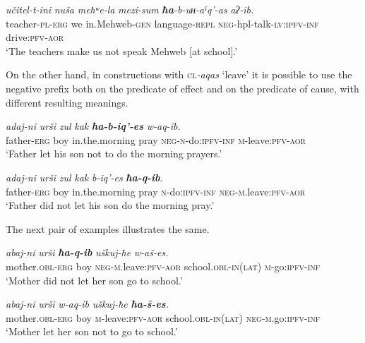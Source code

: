 ﻿\documentclass[output=paper]{langsci/langscibook}
\begin{document}
\pagebreak

\ex %
\gll *\emph{učitel-t-ini} \emph{nuša} \emph{meħʷe-la} \emph{mezi-sum} \emph{\textbf{ħa}-b-uʜ-aˤq'-as} \emph{aʔ-ib.}\\
teacher-\textsc{pl}-\textsc{erg} we in.Mehweb-\textsc{gen} language-\textsc{repl}  \textsc{neg}-hpl-talk-\textsc{lv}:\textsc{ipfv}-\textsc{inf} drive:\textsc{pfv}-\textsc{aor}\\
\glt `The teachers make us not speak Mehweb [at school].'
\z
\z

On the other hand, in constructions with \textsc{cl}\emph{-aqas} `leave'
it is possible to use the negative prefix both on the predicate of effect and on the predicate of cause,
with different resulting meanings.

\ea %
\gll \emph{adaj-ni} \emph{urši} \emph{zul} \emph{kak}  \emph{\textbf{ħa-b-iq'-es}}  \emph{w-aq-ib.}\\
father-\textsc{erg} boy in.the.morning pray  \textsc{neg}-\textsc{n}-do:\textsc{ipfv}-\textsc{inf} \textsc{m}-leave:\textsc{pfv}-\textsc{aor}\\
\glt `Father let his son not to do the morning prayers.'

\ex %
\gll \emph{adaj-ni} \emph{urši} \emph{zul} \emph{kak} \emph{b-iq'-es} \emph{\textbf{ħa-q-ib}.}\\
father-\textsc{erg} boy in.the.morning pray \textsc{n}-do:\textsc{ipfv}-\textsc{inf} \textsc{neg}-\textsc{m}.leave:\textsc{pfv}-\textsc{aor}\\
\glt `Father did not let his son do the morning pray.'
\z

The next pair of examples illustrates the same.

\ea %
\gll \emph{abaj-ni} \emph{urši} \emph{\textbf{ħa-q-ib}} \emph{uškuj-ħe} \emph{w-aš-es.}\\
mother.\textsc{obl}-\textsc{erg} boy \textsc{neg}-\textsc{m}.leave:\textsc{pfv}-\textsc{aor} school.\textsc{obl}-\textsc{in}(\textsc{lat}) \textsc{m}-go:\textsc{ipfv}-\textsc{inf}\\
\glt `Mother did not let her son go to school.'

\ex %
\gll \emph{abaj-ni} \emph{urši} \emph{w-aq-ib} \emph{uškuj-ħe} \emph{\textbf{ħa-š-es}.}\\
mother.\textsc{obl}-\textsc{erg} boy \textsc{m}-leave:\textsc{pfv}-\textsc{aor} school.\textsc{obl}-\textsc{in}(\textsc{lat}) \textsc{neg}-\textsc{m}.go:\textsc{ipfv}-\textsc{inf}\\
\glt `Mother let her son not to go to school.'
\z
\end{document}
